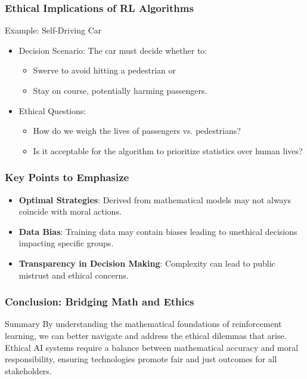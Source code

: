 \documentclass[aspectratio=169]{beamer}
\begin{document}
\begin{frame}[fragile]
    \frametitle{Ethical Implications of RL Algorithms}
    \begin{block}{Example: Self-Driving Car}
        \begin{itemize}
            \item Decision Scenario: The car must decide whether to:
            \begin{itemize}
                \item Swerve to avoid hitting a pedestrian or 
                \item Stay on course, potentially harming passengers.
            \end{itemize}
            \item Ethical Questions:
            \begin{itemize}
                \item How do we weigh the lives of passengers vs. pedestrians?
                \item Is it acceptable for the algorithm to prioritize statistics over human lives?
            \end{itemize}
        \end{itemize}
    \end{block}
\end{frame}

\begin{frame}[fragile]
    \frametitle{Key Points to Emphasize}
    \begin{itemize}
        \item \textbf{Optimal Strategies}: Derived from mathematical models may not always coincide with moral actions.
        \item \textbf{Data Bias}: Training data may contain biases leading to unethical decisions impacting specific groups.
        \item \textbf{Transparency in Decision Making}: Complexity can lead to public mistrust and ethical concerns.
    \end{itemize}
\end{frame}

\begin{frame}[fragile]
    \frametitle{Conclusion: Bridging Math and Ethics}
    \begin{block}{Summary}
        By understanding the mathematical foundations of reinforcement learning, we can better navigate and address the ethical dilemmas that arise. Ethical AI systems require a balance between mathematical accuracy and moral responsibility, ensuring technologies promote fair and just outcomes for all stakeholders.
    \end{block}
\end{frame}
\end{document}
